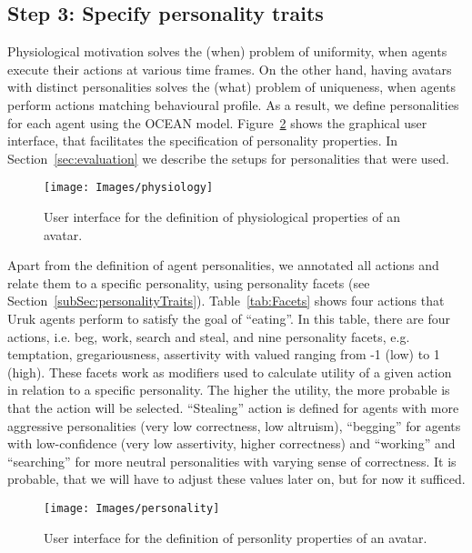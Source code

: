 \documentclass[graybox]{svmult}
\begin{document}
\subsection{Step 3: Specify personality traits}

Physiological motivation solves the (when) problem of uniformity, when agents execute their actions at various time frames. On the other hand, having avatars with distinct personalities solves the (what) problem of uniqueness, when agents perform actions matching behavioural profile. As a result, we define personalities for each agent using the OCEAN model. Figure~\ref{fig:personality} shows the graphical user interface, that facilitates the specification of personality properties. In Section~\ref{sec:evaluation} we describe the setups for personalities that were used. 

\begin{figure}[!ht]
    \texttt{[image: Images/physiology]}
    \caption{User interface for the definition of physiological properties of an avatar.}
    \label{fig:physiology}
\end{figure}%


Apart from the definition of agent personalities, we annotated all actions and relate them to a specific personality, using personality facets (see Section~\ref{subSec:personalityTraits}). Table~\ref{tab:Facets} shows four actions that Uruk agents perform to satisfy the goal of ``eating''. In this table, there are four actions, i.e. beg, work, search and steal, and nine personality facets, e.g. temptation, gregariousness, assertivity with valued ranging from -1 (low) to 1 (high). These facets work as modifiers used to calculate utility of a given action in relation to a specific personality. The higher the utility, the more probable is that the action will be selected. ``Stealing'' action is defined for agents with more aggressive personalities (very low correctness, low altruism), ``begging'' for agents with low-confidence (very low assertivity, higher correctness) and ``working'' and ``searching'' for more neutral personalities with varying sense of correctness. It is probable, that we will have to adjust these values later on, but for now it sufficed.

\begin{figure}[!ht]
    \centering
    \texttt{[image: Images/personality]}
    \caption{User interface for the definition of personlity properties of an avatar.}
    \label{fig:personality}
\end{figure}%
\end{document}
